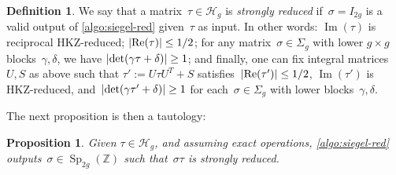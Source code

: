 \documentclass[12pt,oneside]{amsart}
\numberwithin{equation}{section}
\newtheorem{prop}[equation]{Proposition}
\theoremstyle{definition}
\newtheorem{defn}[equation]{Definition}
\newcommand{\Z}{\mathbb{Z}}
\newcommand{\Half}{\mathcal{H}}
\DeclareMathOperator{\im}{Im}
\DeclareMathOperator{\re}{Re}
\DeclareMathOperator{\Sp}{Sp}
\DeclarePairedDelimiter{\abs}{|}{|}
\begin{document}
\begin{defn}
  \label{def:strong-red}
  We say that a matrix~$\tau\in \Half_g$ is \emph{strongly reduced}
  if~$\sigma = I_{2g}$ is a valid output of \cref{algo:siegel-red} given~$\tau$
  as input. In other words: $\im(\tau)$ is reciprocal HKZ-reduced;
  $\abs{\re(\tau)}\leq 1/2$; for any matrix~$\sigma\in \Sigma_g$ with lower
  $g\times g$ blocks~$\gamma,\delta$, we have
  $\abs{\det(\gamma\tau+\delta)}\geq 1$; and finally, one can fix integral
  matrices~$U,S$ as above such that $\tau' := U\tau U^T + S$
  satisfies~$\abs{\re(\tau')}\leq 1/2$, $\im(\tau')$ is HKZ-reduced,
  and~$\abs{\det(\gamma\tau'+\delta)}\geq 1$ for each~$\sigma\in \Sigma_g$ with
  lower blocks~$\gamma,\delta$.
\end{defn}

The next proposition is then a tautology:

\begin{prop}
  \label{prop:strong-red}
  Given $\tau\in \Half_g$, and assuming exact operations,
  \cref{algo:siegel-red} outputs~$\sigma\in \Sp_{2g}(\Z)$ such
  that~$\sigma\tau$ is strongly reduced.
\end{prop}
\end{document}
